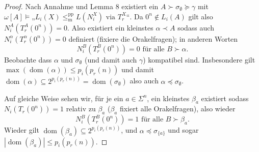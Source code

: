 \documentclass[nofonts]{uebung}
\DeclareMathOperator{\dom}{dom}
\def\leqmpp{\ensuremath{\leq_\mathrm{m}^\mathrm{pp}}}
\begin{document}
\begin{proof}
    Nach Annahme und Lemma 8 existiert ein $A\succ\sigma_\emptyset\succeq \gamma$ mit $\omega[A] \vDash „L_{i}(X)\leqmpp L(N_i^X)\text{ via }T^X_r“$.
    Da $0^n\not\in L_i(A)$ gilt also $N^A_i(T_r^A(0^n))=0$.
    Also existiert ein kleinstes $\alpha\prec A$ sodass auch $N^\alpha_i(T_r^\alpha(0^n))=0$ definiert (fixiere die Orakelfragen); in anderen Worten
    \begin{equation}
        N^B_i(T_r^B(0^n))=0 \text{ für alle }B\succ\alpha.
    \end{equation}
    Beobachte dass $\alpha$ und $\sigma_\emptyset$ (und damit auch $\gamma$) kompatibel sind.
    Insbesondere gilt $\max(\dom(\alpha))\leq p_i(p_r(n))$ und damit $\dom(\alpha)\subseteq 2^{p_i(p_r(n))}=\dom(\sigma_\emptyset)$ also auch $\alpha\preceq \sigma_\emptyset$.

    Auf gleiche Weise sehen wir, für je ein $a\in\Sigma^n$, ein kleinstes $\beta_a$ existiert sodass $N_i(T_r(0^n))=1$ relativ zu $\beta_a$ ($\beta_a$ fixiert alle Orakelfragen), also wieder
    \begin{equation}
        N^B_i(T_r^B(0^n))=1 \text{ für alle }B\succ\beta_a.
    \end{equation}
    Wieder gilt $\dom(\beta_a)\subseteq 2^{p_i(p_r(n))}$, und $\alpha\preceq \sigma_{\{a\}}$ und sogar $|\dom(\beta_a)|\leq p_i(p_r(n))$.


\end{proof}
\end{document}
